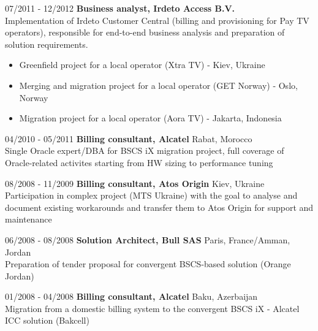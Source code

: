 \documentclass[10pt,a4paper]{extbook}
\begin{document}
\par\vspace{5mm}
07/2011 - 12/2012 \hspace{10mm} \textbf {Business analyst, Irdeto Access B.V.} \\
Implementation of Irdeto Customer Central (billing and provisioning for Pay TV operators), responsible for end-to-end business analysis and preparation of solution requirements.
\begin{itemize}[noitemsep,topsep=3mm,parsep=0pt,partopsep=0pt,itemindent=0pt,leftmargin=4mm]
	\item Greenfield project for a local operator (Xtra TV) - Kiev, Ukraine
	\item Merging and migration project for a local operator (GET Norway) - Oslo, Norway
	\item Migration project for a local operator (Aora TV) - Jakarta, Indonesia
\end{itemize}

04/2010 - 05/2011 \hspace{10mm} \textbf{Billing consultant, Alcatel} \hfill Rabat, Morocco \\
Single Oracle expert/DBA for BSCS iX migration project, full coverage of Oracle-related activites starting from HW sizing to performance tuning

\par\vspace{5mm}
08/2008 - 11/2009 \hspace{10mm} \textbf{Billing consultant, Atos Origin} \hfill  Kiev, Ukraine \\
Participation in complex project (MTS Ukraine) with the goal to analyse and document existing workarounds and transfer them to Atos Origin for support and maintenance

\par\vspace{5mm}
06/2008 - 08/2008 \hspace{10mm} \textbf{Solution Architect, Bull SAS} \hfill Paris, France/Amman, Jordan \\
Preparation of tender proposal for convergent BSCS-based solution (Orange Jordan)
	
\par\vspace{5mm}
01/2008 - 04/2008 \hspace{10mm} \textbf{Billing consultant, Alcatel} \hfill Baku, Azerbaijan \\
Migration from a domestic billing system to the convergent BSCS iX - Alcatel ICC solution (Bakcell)
	
\end{document}
